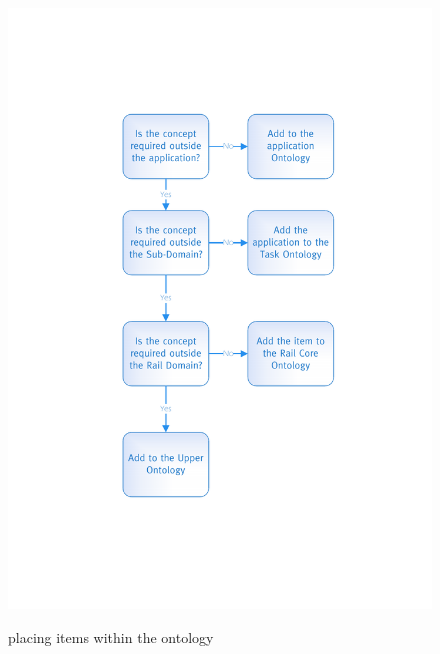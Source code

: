  \begin{figure}[!h]
\myfloatalign
{\includegraphics[width=\linewidth]{gfx/AddToOnt}} 
\caption{placing items within the ontology}
\label{fig:additions}
\end{figure}

